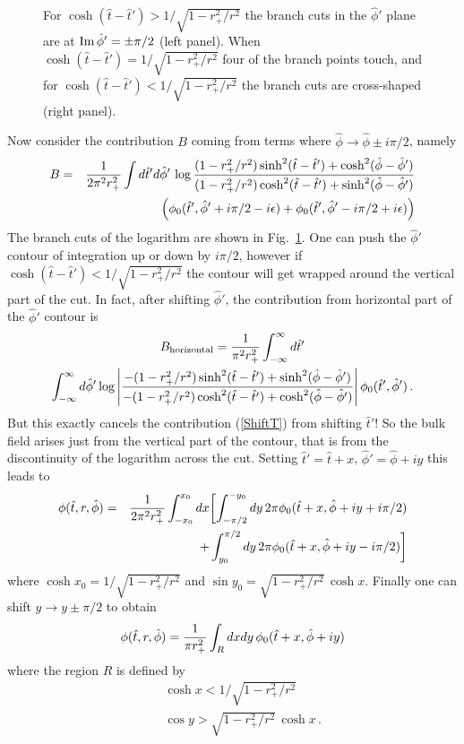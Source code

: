 \documentclass[12pt]{article}
\newcommand{\be}{\begin{equation}}
\newcommand{\ee}{\end{equation}}
\newcommand{\bea}{\begin{eqnarray}}
\newcommand{\eea}{\end{eqnarray}}
\newcommand{\beas}{\begin{eqnarray*}}
\newcommand{\eeas}{\end{eqnarray*}}
\newcommand{\htt}{\hat{t}}
\newcommand{\hp}{\hat{\phi}}
\begin{document}
\begin{figure}
\centerline{ \hspace{2cm} }
\caption{For $\cosh (\htt - \htt') > 1/\sqrt{1 - r_+^2/r^2}$ the branch cuts in the $\hp'$ plane are at
${\rm Im} \, \hp' = \pm \pi / 2$ (left panel).  When $\cosh(\htt - \htt') = 1/\sqrt{1 - r_+^2/r^2}$ four of
the branch points touch, and for $\cosh(\htt - \htt') < 1/\sqrt{1 - r_+^2/r^2}$ the branch cuts are cross-shaped
(right panel).}
\label{Phicuts}
\end{figure}

Now consider the contribution $B$ coming from terms where $\hp \rightarrow \hp \pm i \pi / 2$, namely
%
\beas
B & = & {1 \over 2 \pi^2 r_+^2} \int d\htt' d\hp' \, \log { (1 - r_+^2 / r^2) \sinh^2 (\htt - \htt') + \cosh^2 (\hp - \hp') \over
                                                    (1 - r_+^2 / r^2) \cosh^2 (\htt - \htt') + \sinh^2 (\hp - \hp')} \\
& & \qquad\qquad \left(\phi_0(\htt',\hp' + i \pi / 2 - i \epsilon) + \phi_0(\htt',\hp' - i \pi/2 + i \epsilon)\right)
\eeas
%
The branch cuts of the logarithm are shown in Fig.~\ref{Phicuts}.  One
can push the $\hp'$ contour of integration up or down by $i \pi / 2$,
however if $\cosh (\htt - \htt') < 1/\sqrt{1 - r_+^2 / r^2}$ the
contour will get wrapped around the vertical part of the cut.  In
fact, after shifting $\hp'$, the contribution from horizontal part of
the $\hp'$ contour is
%
\begin{multline}
\label{ShiftPhi}
B_{\rm horizontal} = {1 \over \pi^2 r_+^2} \int_{-\infty}^\infty d\htt' \\
\int_{-\infty}^\infty d\hp' \log \left\vert
{- (1 - r_+^2 / r^2) \sinh^2 (\htt - \htt') + \sinh^2 (\hp - \hp') \over
 - (1 - r_+^2 / r^2) \cosh^2 (\htt - \htt') + \cosh^2 (\hp - \hp')} \right\vert
\phi_0(\htt',\hp')\,.
\end{multline}
%
But this exactly cancels the contribution (\ref{ShiftT}) from shifting $\htt'$!  So the bulk field arises just
from the vertical part of the contour, that is from the discontinuity of the logarithm across the cut.  Setting
$\htt' = \htt + x$, $\hp' = \hp + i y$ this leads to
%
\beas
\phi(\htt,r,\hp) & = & {1 \over 2 \pi^2 r_+^2} \int_{-x_0}^{x_0} dx \biggl[
\int_{-\pi/2}^{-y_0} dy \, 2 \pi \phi_0(\htt + x,\hp + iy + i \pi/2) \\
& & \qquad\qquad\quad\,\,\, + \int_{y_0}^{\pi/2} dy \, 2 \pi \phi_0(\htt + x, \hp + i y - i \pi / 2)\biggr]
\eeas
%
where $\cosh x_0 = 1/\sqrt{1 - r_+^2 / r^2}$ and $\sin y_0 = \sqrt{1 - r_+^2 / r^2} \, \cosh x$.  Finally one can shift
$y \rightarrow y \pm \pi/2$ to obtain
%
\be
\label{MasslessSmear}
\phi(\htt,r,\hp) = {1 \over \pi r_+^2} \int_R dx dy \, \phi_0(\htt + x, \hp + i y)
\ee
%
where the region $R$ is defined by
%
\bea
\label{regionR}
&& \cosh x < 1/\sqrt{1 - r_+^2/r^2} \\
\nonumber
&& \cos y > \sqrt{1 - r_+^2/r^2} \, \cosh x\,.
\eea
%
\end{document}
